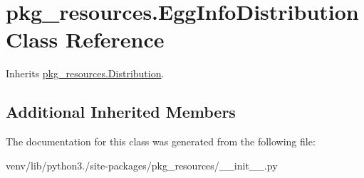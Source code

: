 \hypertarget{classpkg__resources_1_1_egg_info_distribution}{}\section{pkg\+\_\+resources.\+Egg\+Info\+Distribution Class Reference}
\label{classpkg__resources_1_1_egg_info_distribution}


Inherits \hyperlink{classpkg__resources_1_1_distribution}{pkg\+\_\+resources.\+Distribution}.

\subsection*{Additional Inherited Members}


The documentation for this class was generated from the following file\+:\begin{DoxyCompactItemize}
\item 
venv/lib/python3./site-\/packages/pkg\+\_\+resources/\+\_\+\+\_\+init\+\_\+\+\_\+.\+py\end{DoxyCompactItemize}
